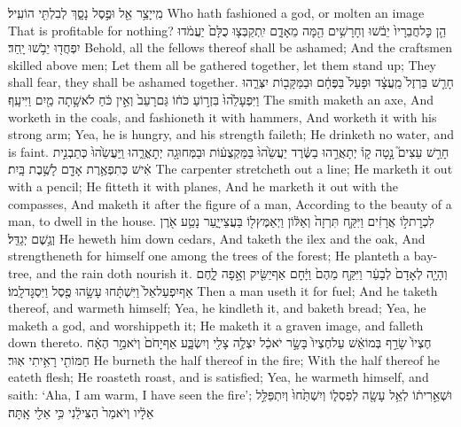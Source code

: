 {מִֽי\maqqaf יָצַ֥ר אֵ֖ל וּפֶ֣סֶל נָסָ֑ךְ לְבִלְתִּ֖י הוֹעִֽיל׃}
{Who hath fashioned a god, or molten an image That is profitable for nothing?}
{הֵ֤ן כׇּל\maqqaf חֲבֵרָיו֙ יֵבֹ֔שׁוּ וְחָרָשִׁ֥ים הֵ֖מָּה מֵאָדָ֑ם יִֽתְקַבְּצ֤וּ כֻלָּם֙ יַעֲמֹ֔דוּ יִפְחֲד֖וּ יֵבֹ֥שׁוּ יָֽחַד׃}
{Behold, all the fellows thereof shall be ashamed; And the craftsmen skilled above men; Let them all be gathered together, let them stand up; They shall fear, they shall be ashamed together.}
{חָרַ֤שׁ בַּרְזֶל֙ מַֽעֲצָ֔ד וּפָעַל֙ בַּפֶּחָ֔ם וּבַמַּקָּב֖וֹת יִצְּרֵ֑הוּ וַיִּפְעָלֵ֙הוּ֙ בִּזְר֣וֹעַ כֹּח֔וֹ גַּם\maqqaf רָעֵב֙ וְאֵ֣ין כֹּ֔חַ לֹא\maqqaf שָׁ֥תָה מַ֖יִם וַיִּיעָֽף׃}
{The smith maketh an axe, And worketh in the coals, and fashioneth it with hammers, And worketh it with his strong arm; Yea, he is hungry, and his strength faileth; He drinketh no water, and is faint.}
{חָרַ֣שׁ עֵצִים֮ נָ֣טָה קָו֒ יְתָאֲרֵ֣הוּ בַשֶּׂ֔רֶד יַעֲשֵׂ֙הוּ֙ בַּמַּקְצֻע֔וֹת וּבַמְּחוּגָ֖ה יְתׇאֳרֵ֑הוּ וַֽיַּעֲשֵׂ֙הוּ֙ כְּתַבְנִ֣ית אִ֔ישׁ כְּתִפְאֶ֥רֶת אָדָ֖ם לָשֶׁ֥בֶת בָּֽיִת׃}
{The carpenter stretcheth out a line; He marketh it out with a pencil; He fitteth it with planes, And he marketh it out with the compasses, And maketh it after the figure of a man, According to the beauty of a man, to dwell in the house.}
{לִכְרׇת\maqqaf ל֣וֹ אֲרָזִ֔ים וַיִּקַּ֤ח תִּרְזָה֙ וְאַלּ֔וֹן וַיְאַמֶּץ\maqqaf ל֖וֹ בַּעֲצֵי\maqqaf יָ֑עַר נָטַ֥ע אֹ֖רֶ\footnotesize{ן} וְגֶ֥שֶׁם יְגַדֵּֽל׃}
{He heweth him down cedars, And taketh the ilex and the oak, And strengtheneth for himself one among the trees of the forest; He planteth a bay-tree, and the rain doth nourish it.}
{וְהָיָ֤ה לְאָדָם֙ לְבָעֵ֔ר וַיִּקַּ֤ח מֵהֶם֙ וַיָּ֔חׇם אַף\maqqaf יַשִּׂ֖יק וְאָ֣פָה לָ֑חֶם אַף\maqqaf יִפְעַל\maqqaf אֵל֙ וַיִּשְׁתָּ֔חוּ עָשָׂ֥הוּ פֶ֖סֶל וַיִּסְגׇּד\maqqaf לָֽמוֹ׃}
{Then a man useth it for fuel; And he taketh thereof, and warmeth himself; Yea, he kindleth it, and baketh bread; Yea, he maketh a god, and worshippeth it; He maketh it a graven image, and falleth down thereto.}
{חֶצְיוֹ֙ שָׂרַ֣ף בְּמוֹ\maqqaf אֵ֔שׁ עַל\maqqaf חֶצְיוֹ֙ בָּשָׂ֣ר יֹאכֵ֔ל יִצְלֶ֥ה צָלִ֖י וְיִשְׂבָּ֑ע אַף\maqqaf יָחֹם֙ וְיֹאמַ֣ר הֶאָ֔ח חַמּוֹתִ֖י רָאִ֥יתִי אֽוּר׃}
{He burneth the half thereof in the fire; With the half thereof he eateth flesh; He roasteth roast, and is satisfied; Yea, he warmeth himself, and saith: ‘Aha, I am warm, I have seen the fire’;}
{וּשְׁאֵ֣רִית֔וֹ לְאֵ֥ל עָשָׂ֖ה לְפִסְל֑וֹ  וְיִשְׁתַּ֙חוּ֙ וְיִתְפַּלֵּ֣ל אֵלָ֔יו וְיֹאמַר֙ הַצִּילֵ֔נִי כִּ֥י אֵלִ֖י אָֽתָּה׃}
